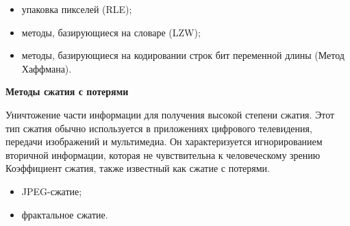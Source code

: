     \begin{itemize}
    		\item упаковка пикселей (RLE);
    		
    		
    		\item методы, базирующиеся на словаре (LZW);
    		
    		
    		
    		\item методы, базирующиеся на кодировании строк бит переменной длины (Метод Хаффмана).
    \end{itemize}
    
    
    \textbf{Методы сжатия с потерями}
    
    Уничтожение части информации для получения высокой степени сжатия. Этот тип сжатия обычно используется в приложениях цифрового телевидения, передачи изображений и мультимедиа. Он характеризуется игнорированием вторичной информации, которая не чувствительна к человеческому зрению Коэффициент сжатия, также известный как сжатие с потерями.
    
    \begin{itemize}
    		\item JPEG-сжатие;
    		\item фрактальное сжатие.
    \end{itemize}
     
    
 	
